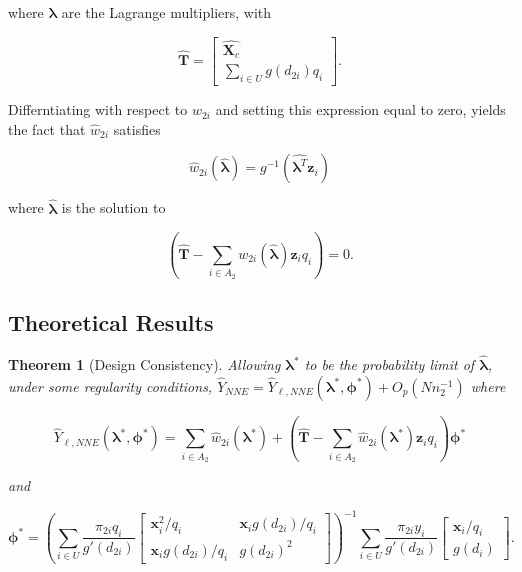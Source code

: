 \documentclass[12pt]{article}
\newtheorem{theorem}{Theorem}
\renewcommand{\bf}[1]{\mathbf{#1}}
\begin{document}
where $\bm \lambda$ are the Lagrange multipliers, with 

$$\hat{\bf T} = 
\begin{bmatrix}
  \hat{\bf X_c} \\ \sum_{i \in U} g(d_{2i}) q_i
\end{bmatrix}.
$$

Differntiating with respect to $w_{2i}$ and setting this expression equal to
zero, yields the fact that $\hat w_{2i}$ satisfies 

$$ \hat w_{2i}(\hat{\bm \lambda}) = g^{-1}(\hat{\bm \lambda^T} \bf z_i) $$

where $\hat{\bm \lambda}$ is the solution to

\begin{equation}\label{eq:lamdc2}
  \left( \hat{\bf T} - \sum_{i \in A_2} w_{2i}(\hat{\bm \lambda}) \bf z_i
  q_i\right) = 0.
\end{equation}

\subsection{Theoretical Results}

\begin{theorem}[Design Consistency]\label{thm:dc2}
  Allowing $\bm \lambda^*$ to be the probability limit of $\hat{\bm \lambda}$,
  under some regularity conditions, $\hat Y_{NNE} = \hat Y_{\ell, NNE}(\bm \lambda^*,
  \bm \phi^*) + O_p(Nn_2^{-1})$ where

  $$
  \hat Y_{\ell, NNE}(\bm \lambda^*, \bm \phi^*) = \sum_{i \in A_2} \hat w_{2i}(
  \bm \lambda^*) + \left(\hat{\bf T} - \sum_{i \in A_2} \hat w_{2i}(
  \bm \lambda^*) \bf z_i q_i\right) \bm \phi^*
  $$

  and 

  $$
  \bm \phi^* =
  \left(\sum_{i \in U} \frac{\pi_{2i} q_i}{g'(d_{2i})} 
  \begin{bmatrix}
    \bf x_i^2 / q_i & \bf x_i g(d_{2i}) / q_i \\
    \bf x_i g(d_{2i}) / q_i & g(d_{2i})^2
  \end{bmatrix}
  \right)^{-1}
  \sum_{i \in U} \frac{\pi_{2i} y_i}{g'(d_{2i})} 
  \begin{bmatrix} \bf x_i / q_i \\ g(d_i) \end{bmatrix}.
  $$
\end{theorem}
\end{document}

